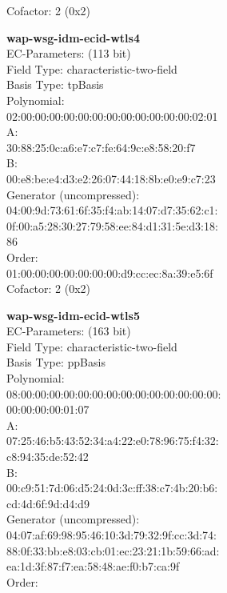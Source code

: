 Cofactor:  2 (0x2)\\
\item \textbf{ wap-wsg-idm-ecid-wtls4 }\\
EC-Parameters: (113 bit)\\
Field Type: characteristic-two-field\\
Basis Type: tpBasis\\
Polynomial:\\
    02:00:00:00:00:00:00:00:00:00:00:00:00:02:01\\
A:   \\
    30:88:25:0c:a6:e7:c7:fe:64:9c:e8:58:20:f7\\
B:   \\
    00:e8:be:e4:d3:e2:26:07:44:18:8b:e0:e9:c7:23\\
Generator (uncompressed):\\
    04:00:9d:73:61:6f:35:f4:ab:14:07:d7:35:62:c1:\\
    0f:00:a5:28:30:27:79:58:ee:84:d1:31:5e:d3:18:\\
    86\\
Order: \\
    01:00:00:00:00:00:00:00:d9:cc:ec:8a:39:e5:6f\\
Cofactor:  2 (0x2)\\
\item \textbf{ wap-wsg-idm-ecid-wtls5 }\\
EC-Parameters: (163 bit)\\
Field Type: characteristic-two-field\\
Basis Type: ppBasis\\
Polynomial:\\
    08:00:00:00:00:00:00:00:00:00:00:00:00:00:00:\\
    00:00:00:00:01:07\\
A:   \\
    07:25:46:b5:43:52:34:a4:22:e0:78:96:75:f4:32:\\
    c8:94:35:de:52:42\\
B:   \\
    00:c9:51:7d:06:d5:24:0d:3c:ff:38:c7:4b:20:b6:\\
    cd:4d:6f:9d:d4:d9\\
Generator (uncompressed):\\
    04:07:af:69:98:95:46:10:3d:79:32:9f:cc:3d:74:\\
    88:0f:33:bb:e8:03:cb:01:ec:23:21:1b:59:66:ad:\\
    ea:1d:3f:87:f7:ea:58:48:ae:f0:b7:ca:9f\\
Order: \\
